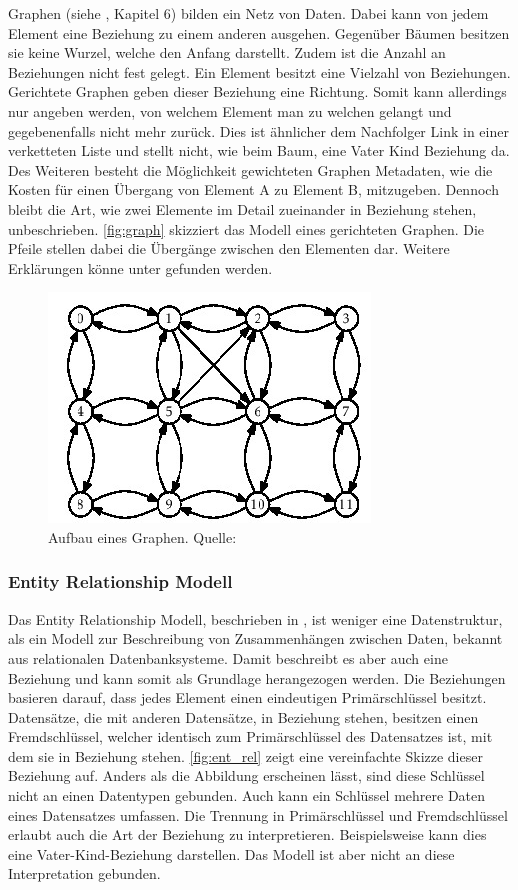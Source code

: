 \documentclass[a4paper]{article}
\begin{document}
	Graphen (siehe \cite{FundData}, Kapitel 6) bilden ein Netz von Daten. Dabei
	kann von jedem Element eine Beziehung zu einem anderen ausgehen. Gegenüber
	Bäumen besitzen sie keine Wurzel, welche den Anfang darstellt. Zudem ist die
	Anzahl an Beziehungen nicht fest gelegt. Ein Element besitzt eine Vielzahl von
	Beziehungen. Gerichtete Graphen geben dieser Beziehung eine Richtung.
	Somit kann allerdings nur angeben werden, von welchem Element man zu welchen
	gelangt und gegebenenfalls nicht mehr zurück. Dies ist ähnlicher dem 
	Nachfolger Link in einer verketteten Liste und stellt nicht,
	wie beim Baum, eine Vater Kind Beziehung da. Des Weiteren besteht die
	Möglichkeit gewichteten Graphen Metadaten, wie die Kosten für einen
	Übergang von Element A zu Element B, mitzugeben. Dennoch bleibt
	die Art, wie zwei Elemente im Detail zueinander in Beziehung stehen,	
	unbeschrieben. \autoref{fig:graph} skizziert das Modell eines gerichteten
	Graphen. Die Pfeile stellen dabei die Übergänge zwischen den Elementen dar.
	Weitere Erklärungen könne unter \cite{Graph} gefunden werden. 

	\begin{figure}[H] 
		\centerline{
			\includegraphics[scale=0.8]{../Bilder/graph.jpg}
		}
		\caption{Aufbau eines Graphen. Quelle: \cite{Graph}}
		\label{fig:graph}
	\end{figure}
	
	\subsubsection{Entity Relationship Modell}
	
	Das Entity Relationship Modell, beschrieben in \cite{EntRel}, ist weniger
	eine Datenstruktur, als ein Modell zur Beschreibung von Zusammenhängen zwischen
	Daten, bekannt aus relationalen Datenbanksysteme. Damit beschreibt es aber
	auch eine Beziehung und kann somit als Grundlage herangezogen werden. Die
	Beziehungen basieren darauf, dass jedes Element einen eindeutigen 
	Primärschlüssel besitzt. Datensätze, die mit anderen Datensätze, in Beziehung 
	stehen, besitzen einen Fremdschlüssel, welcher identisch zum Primärschlüssel
	des Datensatzes ist, mit dem sie in Beziehung stehen. \autoref{fig:ent_rel}
	zeigt eine vereinfachte Skizze dieser Beziehung auf. Anders als die Abbildung
	erscheinen lässt, sind diese Schlüssel nicht an einen Datentypen gebunden. Auch
	kann ein Schlüssel mehrere Daten eines Datensatzes umfassen. Die Trennung
	in Primärschlüssel und Fremdschlüssel erlaubt auch die Art der Beziehung zu
	interpretieren. Beispielsweise kann dies eine Vater-Kind-Beziehung darstellen.
	Das Modell ist aber nicht an diese Interpretation gebunden.
	
\end{document}
